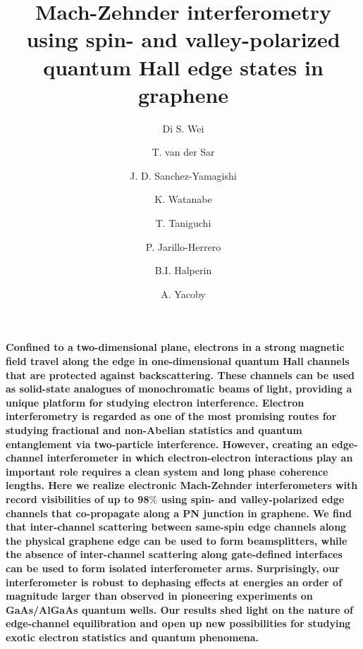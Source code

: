 \documentclass[%
reprint,amsmath,amssymb,aps,prl,superscriptaddress,
twocolumn
]{revtex4-1}
\begin{document}
	
	\title{Mach-Zehnder interferometry using spin- and valley-polarized quantum Hall edge states in graphene}
	
	\author{Di S. Wei}
	
	\author{T. van der Sar}
	
	\author{J. D. Sanchez-Yamagishi}
		
	\author{K. Watanabe}
	
	\author{T. Taniguchi}
	
	\author{P. Jarillo-Herrero}
		
	\author{B.I. Halperin}
		
	\author{A. Yacoby}
	
	
	\maketitle
	
	\textbf{Confined to a two-dimensional plane, electrons in a strong magnetic field travel along the edge in one-dimensional quantum Hall channels that are protected against backscattering.  These channels can be used as solid-state analogues of monochromatic beams of light, providing a unique platform for studying electron interference. Electron interferometry is regarded as one of the most promising routes for studying fractional and non-Abelian statistics and quantum entanglement via two-particle interference. However, creating an edge-channel interferometer in which electron-electron interactions play an important role requires a clean system and long phase coherence lengths. Here we realize electronic Mach-Zehnder interferometers with record visibilities of up to 98$\%$ using spin- and valley-polarized edge channels that co-propagate along a PN junction in graphene. We find that inter-channel scattering between same-spin edge channels along the physical graphene edge can be used to form beamsplitters, while the absence of inter-channel scattering along gate-defined interfaces can be used to form isolated interferometer arms. Surprisingly, our interferometer is robust to dephasing effects at energies an order of magnitude larger than observed in pioneering experiments on GaAs/AlGaAs quantum wells. Our results shed light on the nature of edge-channel equilibration and open up new possibilities for studying exotic electron statistics and quantum phenomena.}  	
\end{document}
